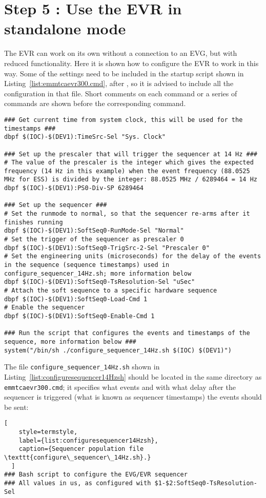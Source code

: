 \documentclass[11pt
  , a4paper
  , article
  , oneside
  , showtrims
]{memoir}
\begin{document}
{\section{Step 5 : Use the EVR in standalone mode}
The EVR can work on its own without a connection to an EVG, but with reduced functionality. Here it is shown how to configure the EVR to work in this way. Some of the settings need to be included in the startup script shown in Listing~\ref{list:emmtcaevr300.cmd}, after , so it is advised to include all the configuration in that file. Short comments on each command or a series of commands are shown before the corresponding command.
\begin{lstlisting}[style=termstyle]
### Get current time from system clock, this will be used for the timestamps ###
dbpf $(IOC)-$(DEV1):TimeSrc-Sel "Sys. Clock"

### Set up the prescaler that will trigger the sequencer at 14 Hz ###
# The value of the prescaler is the integer which gives the expected frequency (14 Hz in this example) when the event frequency (88.0525 MHz for ESS) is divided by the integer: 88.0525 MHz / 6289464 = 14 Hz
dbpf $(IOC)-$(DEV1):PS0-Div-SP 6289464

### Set up the sequencer ###
# Set the runmode to normal, so that the sequencer re-arms after it finishes running
dbpf $(IOC)-$(DEV1):SoftSeq0-RunMode-Sel "Normal"
# Set the trigger of the sequencer as prescaler 0
dbpf $(IOC)-$(DEV1):SoftSeq0-TrigSrc-2-Sel "Prescaler 0"
# Set the engineering units (microseconds) for the delay of the events in the sequence (sequence timestamps) used in configure_sequencer_14Hz.sh; more information below
dbpf $(IOC)-$(DEV1):SoftSeq0-TsResolution-Sel "uSec"
# Attach the soft sequence to a specific hardware sequence
dbpf $(IOC)-$(DEV1):SoftSeq0-Load-Cmd 1
# Enable the sequencer
dbpf $(IOC)-$(DEV1):SoftSeq0-Enable-Cmd 1

### Run the script that configures the events and timestamps of the sequence, more information below ###
system("/bin/sh ./configure_sequencer_14Hz.sh $(IOC) $(DEV1)")
\end{lstlisting}

The file \texttt{configure\_sequencer\_14Hz.sh} shown in Listing~\ref{list:configuresequencer14Hzsh} should be located in the same directory as \texttt{emmtcaevr300.cmd}; it specifies what events and with what delay after the sequencer is triggered (what is known as sequencer timestamps) the events should be sent:
\begin{lstlisting}[
    style=termstyle,
    label={list:configuresequencer14Hzsh},
    caption={Sequencer population file \texttt{configure\_sequencer\_14Hz.sh}.}
  ]
### Bash script to configure the EVG/EVR sequencer
### All values in us, as configured with $1-$2:SoftSeq0-TsResolution-Sel


\end{lstlisting}}
\end{document}
